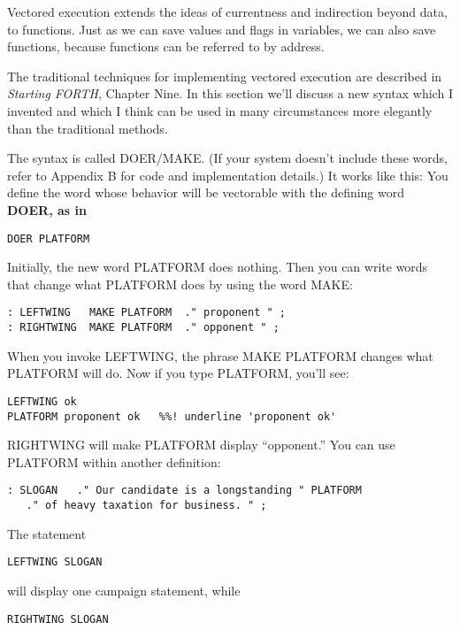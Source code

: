 Vectored execution extends the ideas of currentness and indirection
beyond data, to functions. Just as we can save values and flags in
variables, we can also save functions, because functions can be referred to
by address.

The traditional techniques for implementing vectored execution are
described in \emph{Starting FORTH}, Chapter Nine. In this section we'll
discuss a new syntax which I invented and which I think can be used in many
circumstances more elegantly than the traditional methods.

The syntax is called DOER/MAKE. (If your system doesn't include
these words, refer to Appendix B for code and implementation details.) It
works like this: You define the word whose behavior will be vectorable
with the defining word \bf{DOER}, as in

\begin{verbatim}
DOER PLATFORM
\end{verbatim}

Initially, the new word PLATFORM does nothing. Then you can write
words that change what PLATFORM does by using the word MAKE:

\begin{verbatim}
: LEFTWING   MAKE PLATFORM  ." proponent " ;
: RIGHTWING  MAKE PLATFORM  ." opponent " ;
\end{verbatim}

When you invoke LEFTWING, the phrase MAKE PLATFORM changes
what PLATFORM will do. Now if you type PLATFORM, you'll see:

\begin{verbatim}
LEFTWING ok
PLATFORM proponent ok	%%! underline 'proponent ok'
\end{verbatim}

RIGHTWING will make PLATFORM display ``opponent.'' You can use
PLATFORM within another definition:

\begin{verbatim}
: SLOGAN   ." Our candidate is a longstanding " PLATFORM
   ." of heavy taxation for business. " ;
\end{verbatim}

The statement

\begin{verbatim}
LEFTWING SLOGAN
\end{verbatim}

will display one campaign statement, while

\begin{verbatim}
RIGHTWING SLOGAN
\end{verbatim}

